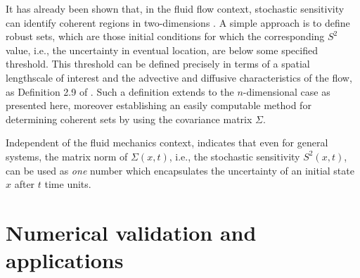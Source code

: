 It has already been shown that, in the fluid flow context, stochastic sensitivity can identify coherent regions in two-dimensions \cite{BadzaEtAl_2023_HowSensitiveAre, Balasuriya_2020_StochasticSensitivityComputable}.
A simple approach is to define robust sets, which are those initial conditions for which the corresponding \(S^2\) value, i.e., the uncertainty in eventual location,  are below some specified threshold.
This threshold can be defined precisely in terms of a spatial lengthscale of interest and the advective and diffusive characteristics of the flow, as Definition 2.9 of \cite{Balasuriya_2020_StochasticSensitivityComputable}.
Such a definition extends to the \(n\)-dimensional case as presented here, moreover establishing an easily computable method for determining coherent sets by using the covariance matrix $ \Sigma $.

Independent of the fluid mechanics context,  indicates that even for general systems, the matrix norm
of $ \Sigma(x,t) $, i.e., the stochastic sensitivity $ S^2(x,t) $, can be used as {\em one} number which encapsulates the uncertainty of an initial state $ x $ after $ t $ time units. 


% 
\section{Numerical validation and applications}\label{sec:numerics}

